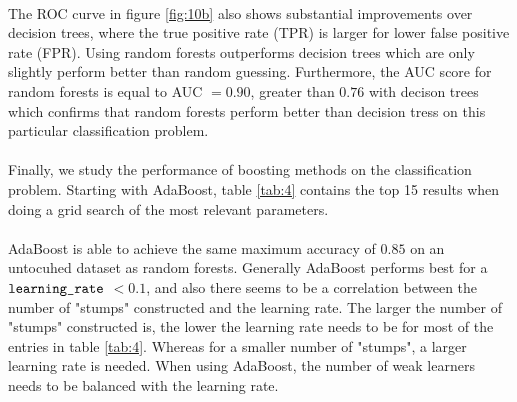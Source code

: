 \documentclass[a4paper,twocolumn]{article}
\begin{document}
\\
The ROC curve in figure \ref{fig:10b} also shows substantial improvements over decision trees, where the true positive rate (TPR) is larger for lower false positive rate (FPR). Using random forests outperforms decision trees which are only slightly perform better than random guessing. Furthermore, the AUC score for random forests is equal to AUC $= 0.90$, greater than $0.76$ with decison trees which confirms that random forests perform better than decision tress on this particular classification problem.\\
\\
Finally, we study the performance of boosting methods on the classification problem. Starting with AdaBoost, table \ref{tab:4} contains the top 15 results when doing a grid search of the most relevant parameters.\\
\\ 
AdaBoost is able to achieve the same maximum accuracy of $0.85$ on an untocuhed dataset as random forests. Generally AdaBoost performs best for a $\verb"learning_rate"$ $< 0.1$, and also there seems to be a correlation between the number of "stumps" constructed and the learning rate. The larger the number of "stumps" constructed is, the lower the learning rate needs to be for most of the entries in table \ref{tab:4}. Whereas for a smaller number of "stumps", a larger learning rate is needed. When using AdaBoost, the number of weak learners needs to be balanced with the learning rate.\\
\end{document}
